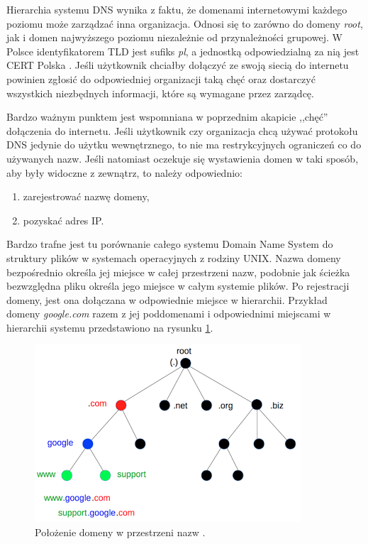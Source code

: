 Hierarchia systemu DNS wynika z faktu, że domenami internetowymi każdego poziomu może zarządzać inna organizacja. Odnosi się to
zarówno do domeny \textit{root}, jak i domen najwyższego poziomu niezależnie od przynależności grupowej. W Polsce identyfikatorem
TLD jest sufiks \textit{pl}, a jednostką odpowiedzialną za nią jest CERT Polska \cite{cert}. Jeśli użytkownik chciałby dołączyć
ze swoją siecią do internetu powinien zgłosić do odpowiedniej organizacji taką chęć oraz dostarczyć wszystkich niezbędnych
informacji, które są wymagane przez zarządcę.

Bardzo ważnym punktem jest wspomniana w poprzednim akapicie ,,chęć'' dołączenia do internetu. Jeśli użytkownik czy organizacja
chcą używać protokołu DNS jedynie do użytku wewnętrznego, to nie ma restrykcyjnych ograniczeń co do używanych nazw. Jeśli natomiast
oczekuje się wystawienia domen w taki sposób, aby były widoczne z zewnątrz, to należy odpowiednio:
\begin{enumerate}
	\item zarejestrować nazwę domeny,
	\item pozyskać adres IP.
\end{enumerate}

Bardzo trafne jest tu porównanie całego systemu Domain Name System do struktury plików w systemach operacyjnych z rodziny UNIX.
Nazwa domeny bezpośrednio określa jej miejsce w całej przestrzeni nazw, podobnie jak ścieżka bezwzględna pliku określa jego miejsce
w całym systemie plików. Po rejestracji domeny, jest ona dołączana w odpowiednie miejsce w hierarchii. Przykład domeny \textit{google.com}
razem z jej poddomenami i odpowiednimi miejscami w hierarchii systemu przedstawiono na rysunku \ref{example_domain_tree}.

\begin{center}
	\begin{figure}
	\includegraphics[scale=1]{image/domain_tree}
	\caption{Położenie domeny w przestrzeni nazw \cite{domain_tree_src}.}
	\label{example_domain_tree}
	\end{figure}
\end{center}

